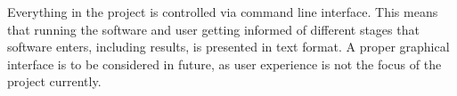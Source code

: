         Everything in the project is controlled via command line interface. This means that running the software and user getting informed of different stages that software enters, including results, is presented in text format. A proper graphical interface is to be considered in future, as user experience is not the focus of the project currently.